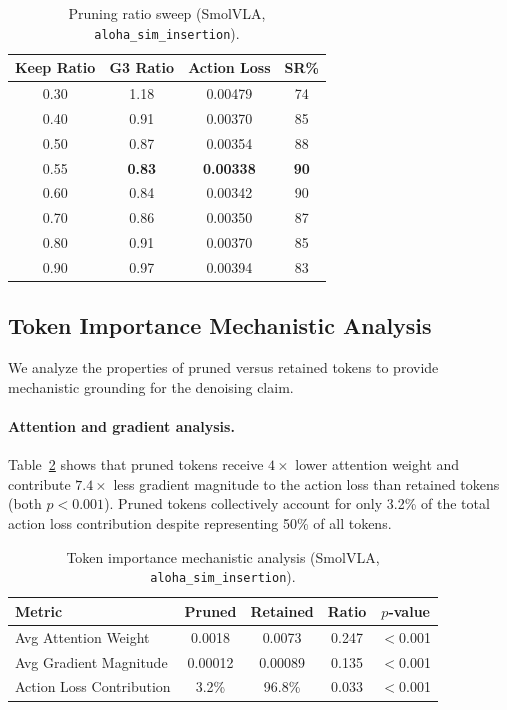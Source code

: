 \documentclass[10pt,twocolumn]{article}
\begin{document}
\begin{table}[t]
\centering
\caption{Pruning ratio sweep (SmolVLA, \texttt{aloha\_sim\_insertion}).}
\label{tab:ratio_sweep}
\begin{tabular}{cccc}
\toprule
Keep Ratio & G3 Ratio & Action Loss & SR\% \\
\midrule
0.30 & 1.18 & 0.00479 & 74 \\
0.40 & 0.91 & 0.00370 & 85 \\
0.50 & 0.87 & 0.00354 & 88 \\
0.55 & \textbf{0.83} & \textbf{0.00338} & \textbf{90} \\
0.60 & 0.84 & 0.00342 & 90 \\
0.70 & 0.86 & 0.00350 & 87 \\
0.80 & 0.91 & 0.00370 & 85 \\
0.90 & 0.97 & 0.00394 & 83 \\
\bottomrule
\end{tabular}
\end{table}

\subsection{Token Importance Mechanistic Analysis}
\label{sec:mechanistic}

We analyze the properties of pruned versus retained tokens to provide mechanistic grounding for the denoising claim.

\paragraph{Attention and gradient analysis.}
Table~\ref{tab:mechanistic} shows that pruned tokens receive $4\times$ lower attention weight and contribute $7.4\times$ less gradient magnitude to the action loss than retained tokens (both $p < 0.001$). Pruned tokens collectively account for only 3.2\% of the total action loss contribution despite representing 50\% of all tokens.

\begin{table}[t]
\centering
\caption{Token importance mechanistic analysis (SmolVLA, \texttt{aloha\_sim\_insertion}).}
\label{tab:mechanistic}
\begin{tabular}{lcccc}
\toprule
Metric & Pruned & Retained & Ratio & $p$-value \\
\midrule
Avg Attention Weight & 0.0018 & 0.0073 & 0.247 & $<$0.001 \\
Avg Gradient Magnitude & 0.00012 & 0.00089 & 0.135 & $<$0.001 \\
Action Loss Contribution & 3.2\% & 96.8\% & 0.033 & $<$0.001 \\
\bottomrule
\end{tabular}
\end{table}
\end{document}
